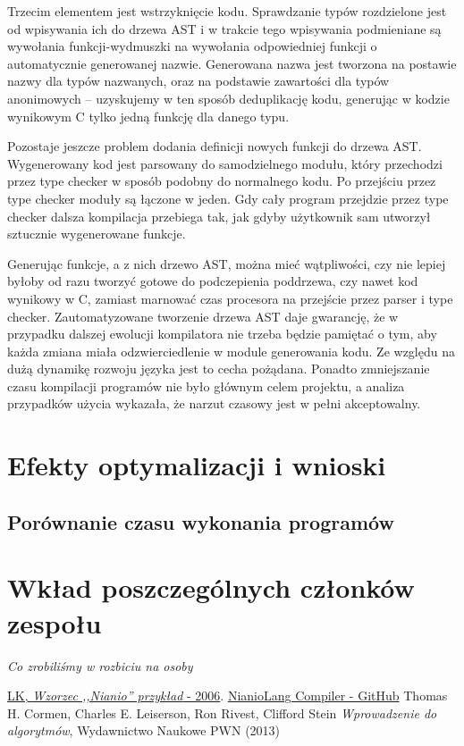 \documentclass[licencjacka]{pracamgr}
\begin{document}
Trzecim elementem jest wstrzyknięcie kodu. Sprawdzanie typów rozdzielone jest od wpisywania ich do drzewa AST
i w trakcie tego wpisywania podmieniane są wywołania funkcji-wydmuszki na wywołania
odpowiedniej funkcji o automatycznie generowanej nazwie. Generowana nazwa jest tworzona na postawie nazwy dla typów nazwanych, oraz na podstawie zawartości
dla typów anonimowych -- uzyskujemy w ten sposób deduplikację kodu, generując w kodzie wynikowym C tylko jedną funkcję dla danego typu.

Pozostaje jeszcze problem dodania definicji nowych funkcji do drzewa AST. Wygenerowany kod jest parsowany do samodzielnego modułu,
który przechodzi przez type checker w sposób podobny do normalnego kodu. Po przejściu przez type checker moduły są łączone w jeden. Gdy cały program przejdzie przez type checker
dalsza kompilacja przebiega tak, jak gdyby użytkownik sam utworzył sztucznie wygenerowane funkcje.

Generując funkcje, a z nich drzewo AST, można mieć wątpliwości, czy nie lepiej byłoby od razu tworzyć gotowe do podczepienia poddrzewa, czy nawet kod wynikowy w C,
zamiast marnować czas procesora na przejście przez parser i type checker. 
Zautomatyzowane tworzenie drzewa AST daje gwarancję, że w przypadku dalszej ewolucji kompilatora nie trzeba będzie pamiętać o tym,
aby każda zmiana miała odzwierciedlenie w module generowania kodu. Ze względu na dużą dynamikę rozwoju języka jest to cecha pożądana.
Ponadto zmniejszanie czasu kompilacji programów nie było głównym celem projektu, a analiza przypadków użycia wykazała, że narzut czasowy jest w pełni akceptowalny.

\chapter{Efekty optymalizacji i wnioski}
\section{Porównanie czasu wykonania programów}

\chapter{Wkład poszczególnych członków zespołu}
\emph{Co zrobiliśmy w rozbiciu na osoby}


\appendix

\begin{thebibliography}{99}

 \href{https://www.mimuw.edu.pl/~chrzaszc/BPJ20067/nianio.pdf}{LK, \textit{Wzorzec ,,Nianio'' przykład} - 2006}.
 \href{https://github.com/nianiolang/nl}{NianioLang Compiler - GitHub}
 Thomas H. Cormen, Charles E. Leiserson, Ron Rivest, Clifford Stein \textit{Wprowadzenie do algorytmów}, Wydawnictwo Naukowe PWN (2013)


\end{thebibliography}
\end{document}
